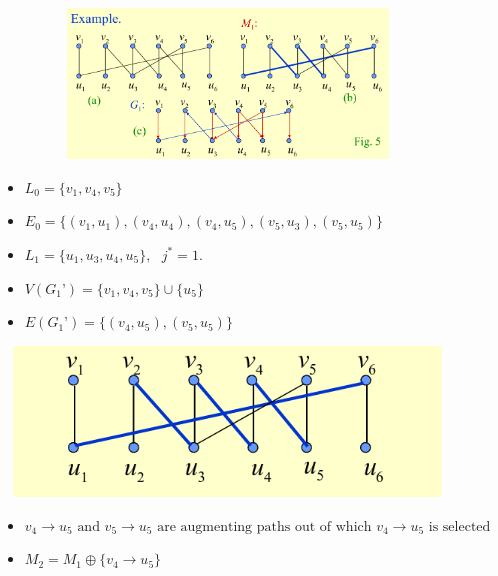 \documentclass[11pt]{beamer}
\theoremstyle{definition}
\begin{document}
\begin{frame}
\includegraphics[width=12cm,height=4cm]{hopstep1}\cite{hopcroft}\\
\begin{itemize}
\item $L_0 = \{v_1, v_4, v_5\}$
\item $E_0 = \{(v_1, u_1), (v_4, u_4), (v_4, u_5), (v_5, u_3), (v_5, u_5)\}$
\item $L_1 = \{u_1, u_3, u_4, u_5\},\mbox{ }j^*=1$.
\item $V(G_1’) = \{v_1, v_4, v_5\}\cup\{u_5\}$
\item	$E(G_1’) = \{(v_4, u_5), (v_5, u_5)\}$
\end{itemize}
\end{frame}

\begin{frame}
\includegraphics[width=12cm,height=4cm]{hopstep2}\cite{hopcroft}\\
\begin{itemize}
\item $v_4 \rightarrow u_5 \mbox{ and } v_5 \rightarrow u_5 \mbox{ are augmenting paths out of which }v_4 \rightarrow u_5 \mbox{ is selected }$
\item $M_2 = M_1 \oplus \{v_4 \rightarrow u_5\}$
\end{itemize}
\end{frame}
\end{document}
